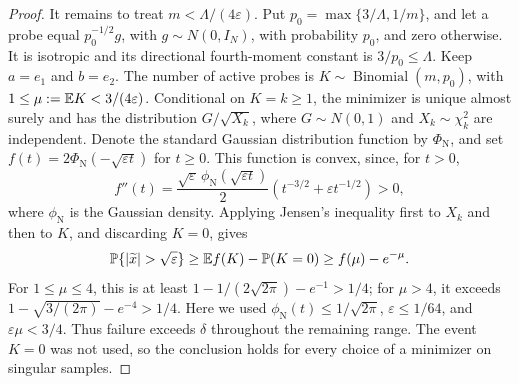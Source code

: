 \documentclass[11pt,a4paper]{article}
\theoremstyle{definition}\newtheorem{definition}[theorem]{Definition}
\theoremstyle{remark}\newtheorem{remark}[theorem]{Remark}
\numberwithin{equation}{section}
\begin{document}
\begin{proof}
It remains to treat $m<\Lambda/(4\varepsilon)$. Put
$p_0=\max\{3/\Lambda,1/m\}$, and let a probe equal
$p_0^{-1/2}g$, with $g\sim N(0,I_N)$, with probability $p_0$,
and zero otherwise. It is isotropic and its directional fourth-moment
constant is $3/p_0\le\Lambda$. Keep $a=e_1$ and $b=e_2$.
The number of active probes is $K\sim\operatorname{Binomial}(m,p_0)$,
with $1\le\mu:=\mathbb E K<3/(4\varepsilon)$. Conditional on $K=k\ge1$,
the minimizer is unique almost surely and has the distribution
$G/\sqrt{X_k}$, where $G\sim N(0,1)$ and $X_k\sim\chi_k^2$ are
independent. Denote the standard Gaussian distribution function by
$\Phi_{\mathrm N}$, and set
$f(t)=2\Phi_{\mathrm N}(-\sqrt{\varepsilon t})$ for $t\ge0$.
This function is convex, since, for $t>0$,
\[
 f''(t)=\frac{\sqrt\varepsilon\,\phi_{\mathrm N}(\sqrt{\varepsilon t})}{2}
        (t^{-3/2}+\varepsilon t^{-1/2})>0,
\]
where $\phi_{\mathrm N}$ is the Gaussian density. Applying Jensen's
inequality first to $X_k$ and then to $K$, and discarding $K=0$, gives
\[
 \Pp\{|\widetilde x|>\sqrt\varepsilon\}
 \ge \E f(K)-\Pp(K=0)\ge f(\mu)-e^{-\mu}.
\]
For $1\le\mu\le4$, this is at least
$1-1/(2\sqrt{2\pi})-e^{-1}>1/4$; for $\mu>4$, it exceeds
$1-\sqrt{3/(2\pi)}-e^{-4}>1/4$.
Here we used $\phi_{\mathrm N}(t)\le1/\sqrt{2\pi}$,
$\varepsilon\le1/64$, and $\varepsilon\mu<3/4$.
Thus failure exceeds $\delta$ throughout the remaining range.
The event $K=0$ was not used, so the conclusion holds for every choice
of a minimizer on singular samples.
\end{proof}
\end{document}
